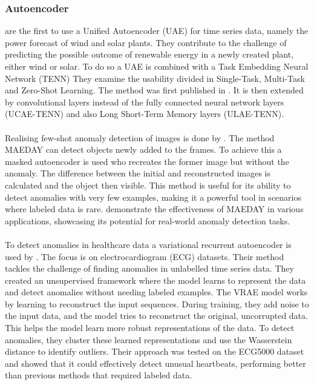 \subsubsection{Autoencoder}
 are the first to use a Unified Autoencoder (UAE) for time series data, namely the power forecast of wind and solar plants. They contribute to the challenge of predicting the possible outcome of renewable energy in a newly created plant, either wind or solar. To do so a UAE is combined with a Task Embedding Neural Network (TENN) They examine the usability divided in Single-Task, Multi-Task and Zero-Shot Learning. The method was first published in . It is then extended by convolutional layers instead of the fully connected neural network layers (UCAE-TENN) and also Long Short-Term Memory layers (ULAE-TENN).\\\\
Realising few-shot anomaly detection of images is done by . The method MAEDAY can detect objects newly added to the frames. To achieve this a masked autoencoder is used who recreates the former image but without the anomaly. The difference between the initial and reconstructed images is calculated and the object then visible.
This method is useful for its ability to detect anomalies with very few examples, making it a powerful tool in scenarios where labeled data is rare.  demonstrate the effectiveness of MAEDAY in various applications, showcasing its potential for real-world anomaly detection tasks.\\\\
To detect anomalies in healthcare data a variational recurrent autoencoder is used by . %
The focus is on electrocardiogram (ECG) datasets. Their method tackles the challenge of finding anomalies in unlabelled time series data. They created an unsupervised framework where the model learns to represent the data and detect anomalies without needing labeled examples.
The VRAE model works by learning to reconstruct the input sequences. During training, they add noise to the input data, and the model tries to reconstruct the original, uncorrupted data. This helps the model learn more robust representations of the data. To detect anomalies, they cluster these learned representations and use the Wasserstein distance to identify outliers. Their approach was tested on the ECG5000 dataset and showed that it could effectively detect unusual heartbeats, performing better than previous methods that required labeled data. \\\\
